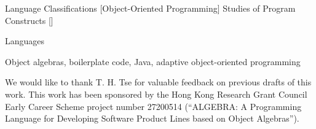 \documentclass[10pt]{sigplanconf}
\begin{document}
\begin{abstract}

\end{abstract}

                {Language Classifications}
                [Object-Oriented Programming]
                {Studies of Program Constructs}
                []

\terms
Languages

\keywords
Object algebras, boilerplate code, Java, adaptive object-oriented programming




























\acks

We would like to thank T. H. Tse for valuable feedback on previous
drafts of this work. This work has been sponsored by the
Hong Kong Research Grant Council Early Career Scheme
project number 27200514 (``ALGEBRA: A Programming Language for Developing Software
Product Lines based on Object Algebras'').
\end{document}
